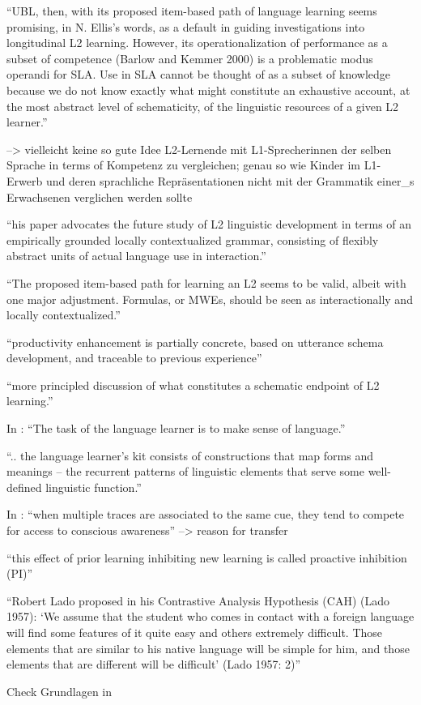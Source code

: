 ``UBL, then, with its proposed item-based path of language learning seems
promising, in N. Ellis’s words, as a default in guiding investigations into
longitudinal L2 learning. However, its operationalization of performance as a
subset of competence (Barlow and Kemmer 2000) is a problematic modus
operandi for SLA. Use in SLA cannot be thought of as a subset of knowledge
because we do not know exactly what might constitute an exhaustive
account, at the most abstract level of schematicity, of the linguistic resources
of a given L2 learner.''

--> vielleicht keine so gute Idee L2-Lernende mit L1-Sprecherinnen der selben Sprache in terms of Kompetenz zu vergleichen; genau so wie Kinder im L1-Erwerb und deren sprachliche Repräsentationen nicht mit der Grammatik einer\_s Erwachsenen verglichen werden sollte

``his paper advocates the future study of L2 linguistic
development in terms of an empirically grounded locally contextualized
grammar, consisting of flexibly abstract units of actual language use in
interaction.''

``The proposed item-based path for learning an L2 seems to be valid, albeit
with one major adjustment. Formulas, or MWEs, should be seen as
interactionally and locally contextualized.''

``productivity enhancement is partially concrete, based on utterance schema
development, and traceable to previous experience''

``more principled discussion of what constitutes a schematic endpoint of L2 learning.''

In \cite{Ellis04}: ``The task of the language learner is to make sense of language.''

``.. the language learner's kit consists of constructions that map forms and meanings -- the recurrent patterns of linguistic elements that serve some well-defined linguistic function.''

In \cite{Ellis06}: ``when multiple
traces are associated to the same cue, they tend to compete for access to
conscious awareness'' --> reason for transfer

``this effect of prior learning inhibiting
new learning is called proactive inhibition (PI)''

``Robert Lado proposed in his
Contrastive Analysis Hypothesis (CAH) (Lado 1957): ‘We assume that the
student who comes in contact with a foreign language will find some features
of it quite easy and others extremely difficult. Those elements that are similar
to his native language will be simple for him, and those elements that
are different will be difficult’ (Lado 1957: 2)''

Check Grundlagen in \cite{Ziem13}

